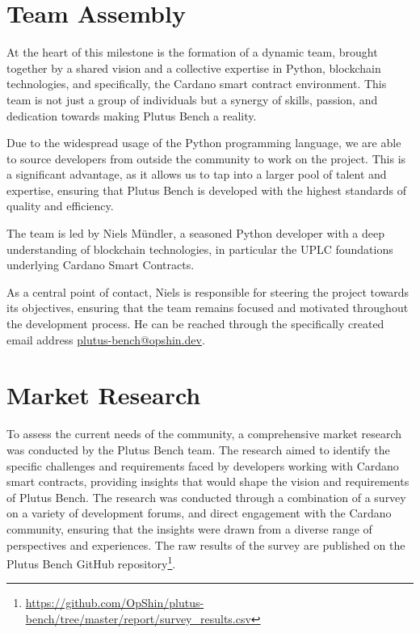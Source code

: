 \documentclass[11pt]{article}
\begin{document}
\section{Team Assembly}

At the heart of this milestone is the formation of a dynamic team, brought together by a shared vision and a collective expertise in Python,
blockchain technologies, and specifically, the Cardano smart contract environment.
This team is not just a group of individuals but a synergy of skills, passion, and dedication towards making Plutus Bench a reality.

Due to the widespread usage of the Python programming language,
we are able to source developers from outside the community to work on the project.
This is a significant advantage, as it allows us to tap into a larger pool of talent and expertise,
ensuring that Plutus Bench is developed with the highest standards of quality and efficiency.

The team is led by Niels Mündler, a seasoned Python developer with a deep understanding of blockchain technologies, in particular
the UPLC foundations underlying Cardano Smart Contracts.

As a central point of contact, Niels is responsible for steering the project towards its objectives,
ensuring that the team remains focused and motivated throughout the development process.
He can be reached through the specifically created email address \href{mailto:plutus-bench@opshin.dev}{plutus-bench@opshin.dev}.

\section{Market Research}

To assess the current needs of the community, a comprehensive market research was conducted by the Plutus Bench team.
The research aimed to identify the specific challenges and requirements faced by developers working with Cardano smart contracts,
providing insights that would shape the vision and requirements of Plutus Bench.
The research was conducted through a combination of a survey on a variety of development forums, and direct engagement with the Cardano community,
ensuring that the insights were drawn from a diverse range of perspectives and experiences.
The raw results of the survey are published on the Plutus Bench GitHub repository\footnote{\url{https://github.com/OpShin/plutus-bench/tree/master/report/survey_results.csv}}.
\end{document}
